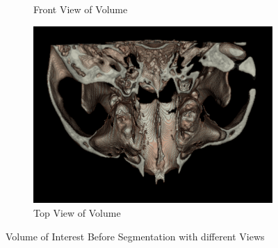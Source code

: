 \documentclass[11.5pt, b5paper]{article}
\begin{document}
\begin{figure}
\begin{subfigure}[b]{0.33\textwidth}
        \caption{Front View of Volume}
    \end{subfigure}
      \hfill
    \begin{subfigure}[b]{0.33\textwidth}
        \centering
        \includegraphics[width=\textwidth]{BST}
        \caption{Top View of Volume}
    \end{subfigure}
    \caption{Volume of Interest Before Segmentation with different Views}
    \label{fig:BS}
\end{figure}
\end{document}
